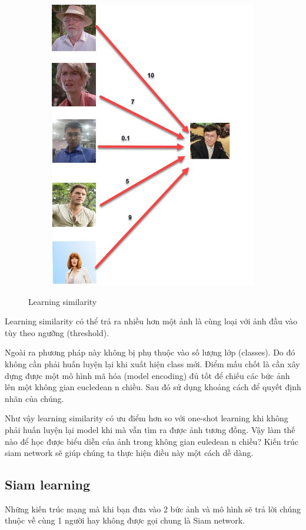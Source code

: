\begin{figure}
    \begin{subfigure}{0.8\textwidth}
        \begin{center}
            \includegraphics[width=0.5\linewidth]{Chapters/items/chap2_15.jpg}
        \end{center}
        \label{fig: chap2_15}
    \end{subfigure}
    \caption{Learning similarity}
\end{figure}
\newpage
Learning similarity có thể trả ra nhiều hơn một ảnh là cùng loại với ảnh đầu vào tùy theo ngưỡng (threshold).

Ngoài ra phương pháp này không bị phụ thuộc vào số lượng lớp (classes).
Do đó không cần phải huấn luyện lại khi xuất hiện class mới.
Điểm mấu chốt là cần xây dựng được một mô hình mã hóa (model encoding) đủ tốt để chiếu các bức
ảnh lên một không gian eucledean n chiều. Sau đó sử dụng khoảng cách để quyết
định nhãn của chúng.

Như vậy learning similarity có ưu điểm hơn so với one-shot learning khi không phải
huấn luyện lại model khi mà vẫn tìm ra được ảnh tương đồng.
Vậy làm thế nào để học được biểu diễn của ảnh trong không gian euledean n chiều?
Kiến trúc siam network sẽ giúp chúng ta thực hiện điều này một cách dễ dàng.

\subsection{Siam learning}

Những kiến trúc mạng mà khi bạn đưa vào 2 bức ảnh và mô hình sẽ trả lời chúng thuộc về
cùng 1 người hay không được gọi chung là Siam network.

